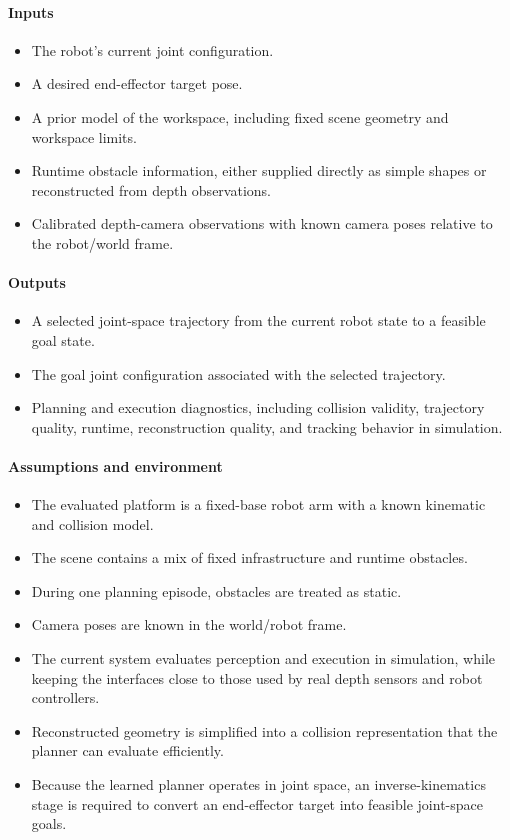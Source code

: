\documentclass[11pt]{article}
\begin{document}
\paragraph{Inputs}
\begin{itemize}
    \item The robot's current joint configuration.
    \item A desired end-effector target pose.
    \item A prior model of the workspace, including fixed scene geometry and workspace limits.
    \item Runtime obstacle information, either supplied directly as simple shapes or reconstructed from depth observations.
    \item Calibrated depth-camera observations with known camera poses relative to the robot/world frame.
\end{itemize}

\paragraph{Outputs}
\begin{itemize}
    \item A selected joint-space trajectory from the current robot state to a feasible goal state.
    \item The goal joint configuration associated with the selected trajectory.
    \item Planning and execution diagnostics, including collision validity, trajectory quality, runtime, reconstruction quality, and tracking behavior in simulation.
\end{itemize}

\paragraph{Assumptions and environment}
\begin{itemize}
    \item The evaluated platform is a fixed-base robot arm with a known kinematic and collision model.
    \item The scene contains a mix of fixed infrastructure and runtime obstacles.
    \item During one planning episode, obstacles are treated as static.
    \item Camera poses are known in the world/robot frame.
    \item The current system evaluates perception and execution in simulation, while keeping the interfaces close to those used by real depth sensors and robot controllers.
    \item Reconstructed geometry is simplified into a collision representation that the planner can evaluate efficiently.
    \item Because the learned planner operates in joint space, an inverse-kinematics stage is required to convert an end-effector target into feasible joint-space goals.
\end{itemize}
\end{document}
